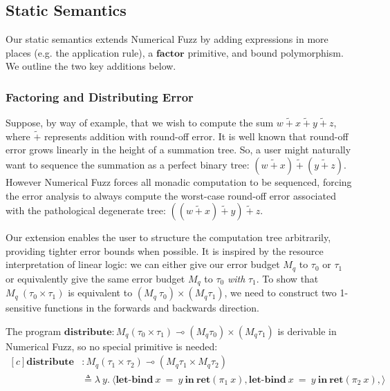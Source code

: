 

\subsection{Static Semantics}
Our static semantics extends Numerical Fuzz by adding expressions in more places
(e.g. the application rule), a $\textbf{factor}$ primitive, and bound
polymorphism. We outline the two key additions below.

\subsubsection*{Factoring and Distributing Error}
Suppose, by way of example, that we wish to compute the sum 
$w~\tilde{+}~x~\tilde{+}~y~\tilde{+}~z$, where $\tilde{+}$ represents addition
with round-off error.
It is well known that round-off error grows linearly in the height of a
summation tree. So, a user might naturally want to sequence the summation as
a perfect binary tree: $(w~\tilde{+}~x)~\tilde{+}~(y~\tilde{+}~z)$.
However Numerical Fuzz forces all monadic computation to be sequenced, forcing
the error analysis 
to always compute the worst-case round-off error associated with the
pathological degenerate tree: $((w~\tilde{+}~x)~\tilde{+}~y)~\tilde{+}~z$.

Our extension enables the user to structure the computation tree arbitrarily,
providing tighter error bounds when possible. It is inspired by the resource
interpretation of linear logic: we can either give our error budget $M_q$ to
$\tau_0$ or $\tau_1$ or equivalently give the same error budget $M_q$ to
$\tau_0$ \textit{with} $\tau_1$. To show that $M_q ~ (\tau_0 \times \tau_1)$
is equivalent to
$(M_q ~ \tau_0) \times (M_q \tau_1)$, we need to construct two 1-sensitive
functions in the forwards and backwards direction.

The program $\textbf{distribute} : M_q (\tau_0 \times \tau_1) \multimap (M_q \tau_0)
\times (M_q \tau_1)$ is derivable in Numerical Fuzz, so no special primitive is
needed:
\begin{equation*} \label{eq:distribute}
\begin{aligned}[c]
\textbf{distribute} &: M_q (\tau_1 \times \tau_2) \multimap (M_q \tau_1 \times M_q \tau_2) \\
 & \triangleq \lambda ~ y. ~ 
   \langle
     \textbf{let-bind} \ x ~ = ~ y \ \textbf{in} \ \textbf{ret}(\pi_1 ~ x),
     \textbf{let-bind} \ x ~ = ~ y \ \textbf{in} \ \textbf{ret}(\pi_2 ~ x),
   \rangle
\end{aligned}
\end{equation*}

